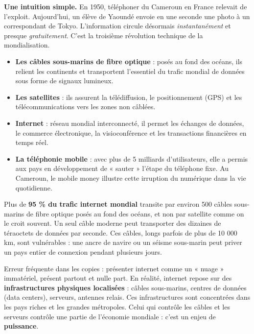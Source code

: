 \documentclass[11pt]{article}
\newcounter{popsec}
\newcounter{popsub}
\newcommand{\courssub}[1]{%
  \stepcounter{popsub}%
  \par\vspace{9pt}\noindent{\popxbold\fontsize{11.5}{13}\selectfont\color{popink}{\color{poporange}\thepopsec.\thepopsub}\hspace{6pt}#1}\par\nopagebreak\vspace{4pt}
}
\begin{document}
\courssub{La révolution des télécommunications}

\textbf{Une intuition simple.} En 1950, téléphoner du Cameroun en France relevait de l'exploit. Aujourd'hui, un élève de Yaoundé envoie en une seconde une photo à un correspondant de Tokyo. L'information circule désormais \emph{instantanément} et presque \emph{gratuitement}. C'est la troisième révolution technique de la mondialisation.

\begin{itemize}
\item \textbf{Les câbles sous-marins de fibre optique} : posés au fond des océans, ils relient les continents et transportent l'essentiel du trafic mondial de données sous forme de signaux lumineux.
\item \textbf{Les satellites} : ils assurent la télédiffusion, le positionnement (GPS) et les télécommunications vers les zones non câblées.
\item \textbf{Internet} : réseau mondial interconnecté, il permet les échanges de données, le commerce électronique, la visioconférence et les transactions financières en temps réel.
\item \textbf{La téléphonie mobile} : avec plus de 5 milliards d'utilisateurs, elle a permis aux pays en développement de « sauter » l'étape du téléphone fixe. Au Cameroun, le mobile money illustre cette irruption du numérique dans la vie quotidienne.
\end{itemize}

\begin{savaistu}
Plus de \textbf{95 \% du trafic internet mondial} transite par environ 500 câbles sous-marins de fibre optique posés au fond des océans, et non par satellite comme on le croit souvent. Un seul câble moderne peut transporter des dizaines de téraoctets de données par seconde. Ces câbles, longs parfois de plus de 10 000 km, sont vulnérables : une ancre de navire ou un séisme sous-marin peut priver un pays entier de connexion pendant plusieurs jours.
\end{savaistu}

\begin{attention}
Erreur fréquente dans les copies : présenter internet comme un « nuage » immatériel, présent partout et nulle part. En réalité, internet repose sur des \textbf{infrastructures physiques localisées} : câbles sous-marins, centres de données (data centers), serveurs, antennes relais. Ces infrastructures sont concentrées dans les pays riches et les grandes métropoles. Celui qui contrôle les câbles et les serveurs contrôle une partie de l'économie mondiale : c'est un enjeu de \textbf{puissance}.
\end{attention}
\end{document}
